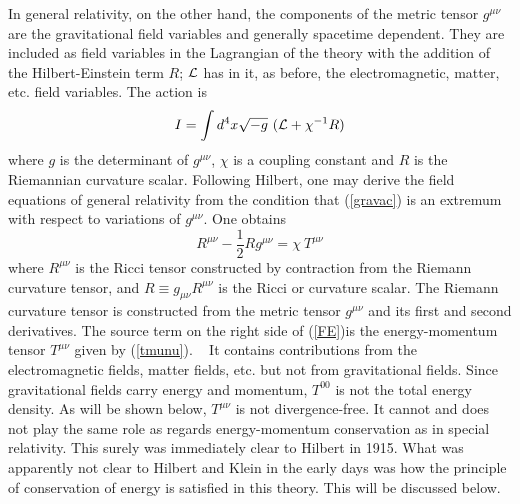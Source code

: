 \documentclass[12pt]{article}
\begin{document}
  
In general relativity, on the other hand, the components of the metric tensor $g^{\mu\nu}$
 are the gravitational field variables and generally  spacetime dependent.
They are included as field variables in  
the Lagrangian of the theory with the addition of the Hilbert-Einstein term $R$;
  ${\cal{L}}$  has in it, as before, the electromagnetic, matter, etc. field variables.
The action is 
\begin{equation}
I =  \int d^4x \sqrt{-g} ~( {\cal{L}} + \chi^{-1}R )  \label{gravac}
\end{equation}
where $g$ is the determinant of $g^{\mu\nu}$, $\chi$ is a
coupling constant and 
$R$ is the Riemannian curvature scalar.
Following Hilbert, one may derive  the field equations of
general relativity from the condition that  (\ref{gravac}) is
 an extremum
with respect to variations of  $g^{\mu\nu}$. One obtains 
\begin{equation} 
R^{\mu\nu} -  {\frac{1}{2}} Rg^{\mu\nu} = \chi ~
T^{\mu\nu} \label{FE} 
\end{equation}
where $R^{\mu\nu}$ is the Ricci tensor constructed by contraction from 
the Riemann curvature tensor,
and $R \equiv g_{\mu\nu}R^{\mu\nu} $ is the Ricci or curvature scalar.  
 The Riemann
curvature tensor is constructed from the metric tensor $g^{\mu\nu}$ and its first and second
derivatives.  The source term
on the right  side of (\ref{FE})is the  
 energy-momentum tensor $T^{\mu\nu}$ given by  (\ref{tmunu}).
\cite{c&w}~ It contains contributions from the
electromagnetic fields, matter fields, etc. but not from gravitational fields.
Since gravitational fields carry energy and momentum,
 $T^{00}$ is not  the total energy density. As will be shown below,
 $T^{\mu\nu}$ is not divergence-free. 
 It cannot and does not play the same role as regards
energy-momentum conservation as  in special relativity.   This surely was 
immediately clear to Hilbert in 1915. What was apparently not clear 
to Hilbert and Klein in the early days was
how the principle of conservation of energy is satisfied in this theory. This will be discussed below.
\end{document}
